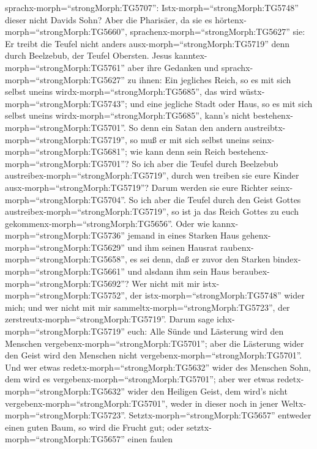 sprachx-morph=``strongMorph:TG5707'': Istx-morph=``strongMorph:TG5748''
dieser nicht Davids Sohn?  Aber die Pharisäer, da sie es
hörtenx-morph=``strongMorph:TG5660'',
sprachenx-morph=``strongMorph:TG5627'' sie: Er treibt die Teufel nicht
anders ausx-morph=``strongMorph:TG5719'' denn durch Beelzebub, der
Teufel Obersten.  Jesus
kanntex-morph=``strongMorph:TG5761'' aber ihre Gedanken und
sprachx-morph=``strongMorph:TG5627'' zu ihnen: Ein jegliches Reich, so
es mit sich selbst uneins wirdx-morph=``strongMorph:TG5685'', das wird
wüstx-morph=``strongMorph:TG5743''; und eine jegliche Stadt oder Haus,
so es mit sich selbst uneins wirdx-morph=``strongMorph:TG5685'', kann's
nicht bestehenx-morph=``strongMorph:TG5701''.  So denn ein
Satan den andern austreibtx-morph=``strongMorph:TG5719'', so muß er mit
sich selbst uneins seinx-morph=``strongMorph:TG5681''; wie kann denn
sein Reich bestehenx-morph=``strongMorph:TG5701''?  So ich
aber die Teufel durch Beelzebub austreibex-morph=``strongMorph:TG5719'',
durch wen treiben sie eure Kinder ausx-morph=``strongMorph:TG5719''?
Darum werden sie eure Richter seinx-morph=``strongMorph:TG5704''.
 So ich aber die Teufel durch den Geist Gottes
austreibex-morph=``strongMorph:TG5719'', so ist ja das Reich Gottes zu
euch gekommenx-morph=``strongMorph:TG5656''.  Oder wie
kannx-morph=``strongMorph:TG5736'' jemand in eines Starken Haus
gehenx-morph=``strongMorph:TG5629'' und ihm seinen Hausrat
raubenx-morph=``strongMorph:TG5658'', es sei denn, daß er zuvor den
Starken bindex-morph=``strongMorph:TG5661'' und alsdann ihm sein Haus
beraubex-morph=``strongMorph:TG5692''?  Wer nicht mit mir
istx-morph=``strongMorph:TG5752'', der istx-morph=``strongMorph:TG5748''
wider mich; und wer nicht mit mir sammeltx-morph=``strongMorph:TG5723'',
der zerstreutx-morph=``strongMorph:TG5719''.  Darum sage
ichx-morph=``strongMorph:TG5719'' euch: Alle Sünde und Lästerung wird
den Menschen vergebenx-morph=``strongMorph:TG5701''; aber die Lästerung
wider den Geist wird den Menschen nicht
vergebenx-morph=``strongMorph:TG5701''.  Und wer etwas
redetx-morph=``strongMorph:TG5632'' wider des Menschen Sohn, dem wird es
vergebenx-morph=``strongMorph:TG5701''; aber wer etwas
redetx-morph=``strongMorph:TG5632'' wider den Heiligen Geist, dem wird's
nicht vergebenx-morph=``strongMorph:TG5701'', weder in dieser noch in
jener Weltx-morph=``strongMorph:TG5723''. 
Setztx-morph=``strongMorph:TG5657'' entweder einen guten Baum, so wird
die Frucht gut; oder setztx-morph=``strongMorph:TG5657'' einen faulen
